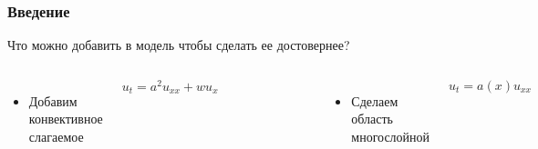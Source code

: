 \documentclass[10pt,pdf,hyperref={unicode}]{beamer}
\begin{document}
\begin{frame}
  \frametitle{Введение}
  Что можно добавить в модель чтобы сделать ее достовернее?
  \begin{columns}
    \begin{itemize}
      \item Добавим конвективное слагаемое
    \end{itemize}
    \begin{equation*}
      u_t = a^2 u_{xx} + w u_x
    \end{equation*}
      \begin{figure}[ht]
        \begin{center}
          \includegraphics[width=3cm]{int2.eps}
        \end{center}
      \end{figure}

    \begin{itemize}
      \item Сделаем область многослойной
    \end{itemize}
    \begin{equation*}
      u_t = a(x) u_{xx}
    \end{equation*}
      \begin{figure}[ht]
        \begin{center}
          \includegraphics[width=3cm]{int3.eps}
        \end{center}
      \end{figure}
  \end{columns}
\end{frame}
\end{document}
